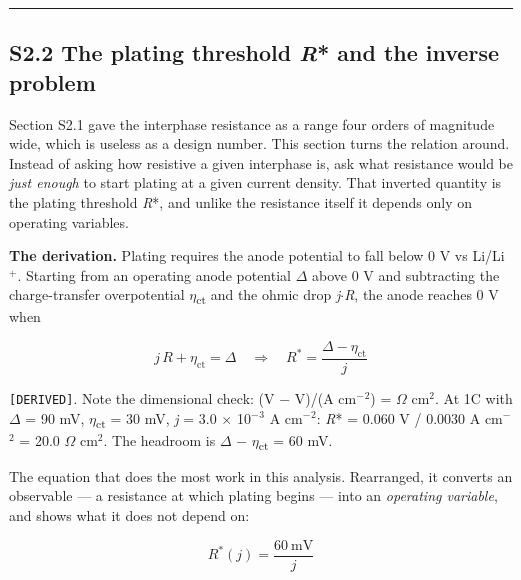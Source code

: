 \documentclass[11pt,a4paper]{article}
\begin{document}
\par\noindent\rule{\linewidth}{0.4pt}\par


\subsection*{S2.2 The plating threshold \emph{R}* and the inverse problem}


Section S2.1 gave the interphase resistance as a range four orders of magnitude wide, which is useless as a design number. This section turns the relation around. Instead of asking how resistive a given interphase is, ask what resistance would be \emph{just enough} to start plating at a given current density. That inverted quantity is the plating threshold \emph{R}*, and unlike the resistance itself it depends only on operating variables.


\textbf{The derivation.} Plating requires the anode potential to fall below 0 V vs Li/Li\ensuremath{^{+}}. Starting from an operating anode potential \ensuremath{\Delta} above 0 V and subtracting the charge-transfer overpotential \emph{\ensuremath{\eta}}\textsubscript{ct} and the ohmic drop \emph{j\ensuremath{\cdot}R}, the anode reaches 0 V when


\begin{equation}j\,R + \eta_{\text{ct}} = \Delta \quad\Longrightarrow\quad R^{*} = \frac{\Delta - \eta_{\text{ct}}}{j} \tag{S2.E3}\end{equation}


\texttt{[DERIVED]}. Note the dimensional check: (V \ensuremath{-} V)/(A cm\ensuremath{^{-}}\ensuremath{^{2}}) = \ensuremath{\Omega} cm\ensuremath{^{2}}. At 1C with \ensuremath{\Delta} = 90 mV, \emph{\ensuremath{\eta}}\textsubscript{ct} = 30 mV, \emph{j} = 3.0 \ensuremath{\times} 10\ensuremath{^{-}}\ensuremath{^{3}} A cm\ensuremath{^{-}}\ensuremath{^{2}}: \emph{R}* = 0.060 V / 0.0030 A cm\ensuremath{^{-}}\ensuremath{^{2}} = 20.0 \ensuremath{\Omega} cm\ensuremath{^{2}}. The headroom is \ensuremath{\Delta} \ensuremath{-} \emph{\ensuremath{\eta}}\textsubscript{ct} = 60 mV.


The equation that does the most work in this analysis. Rearranged, it converts an observable --- a resistance at which plating begins --- into an \emph{operating variable}, and shows what it does not depend on:


\begin{equation}R^{*}(j) = \frac{60\ \text{mV}}{j} \tag{S2.E4}\end{equation}
\end{document}
